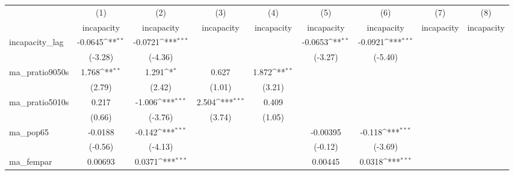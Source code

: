{
\def\sym#1{\ifmmode^{#1}\else\(^{#1}\)\fi}
\begin{tabular}{l*{8}{c}}
\hline\hline
            &\multicolumn{1}{c}{(1)}&\multicolumn{1}{c}{(2)}&\multicolumn{1}{c}{(3)}&\multicolumn{1}{c}{(4)}&\multicolumn{1}{c}{(5)}&\multicolumn{1}{c}{(6)}&\multicolumn{1}{c}{(7)}&\multicolumn{1}{c}{(8)}\\
            &\multicolumn{1}{c}{incapacity}&\multicolumn{1}{c}{incapacity}&\multicolumn{1}{c}{incapacity}&\multicolumn{1}{c}{incapacity}&\multicolumn{1}{c}{incapacity}&\multicolumn{1}{c}{incapacity}&\multicolumn{1}{c}{incapacity}&\multicolumn{1}{c}{incapacity}\\
\hline
incapacity\_lag&     -0.0645\sym{**} &     -0.0721\sym{***}&                     &                     &     -0.0653\sym{**} &     -0.0921\sym{***}&                     &                     \\
            &     (-3.28)         &     (-4.36)         &                     &                     &     (-3.27)         &     (-5.40)         &                     &                     \\
[1em]
ma\_pratio9050s&       1.768\sym{**} &       1.291\sym{*}  &       0.627         &       1.872\sym{**} &                     &                     &                     &                     \\
            &      (2.79)         &      (2.42)         &      (1.01)         &      (3.21)         &                     &                     &                     &                     \\
[1em]
ma\_pratio5010s&       0.217         &      -1.006\sym{***}&       2.504\sym{***}&       0.409         &                     &                     &                     &                     \\
            &      (0.66)         &     (-3.76)         &      (3.74)         &      (1.05)         &                     &                     &                     &                     \\
[1em]
ma\_pop65    &     -0.0188         &      -0.142\sym{***}&                     &                     &    -0.00395         &      -0.118\sym{***}&                     &                     \\
            &     (-0.56)         &     (-4.13)         &                     &                     &     (-0.12)         &     (-3.69)         &                     &                     \\
[1em]
ma\_fempar   &     0.00693         &      0.0371\sym{***}&                     &                     &     0.00445         &      0.0318\sym{***}&                     &                     \\

\end{tabular}}
